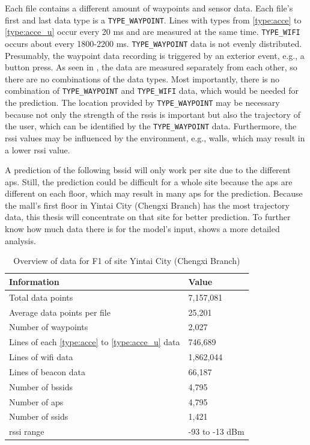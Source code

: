 Each file contains a different amount of waypoints and sensor data.
Each file's first and last data type is a \texttt{TYPE\_WAYPOINT}.
Lines with types from \ref{type:acce} to \ref{type:acce_u} occur every 20 ms and are measured at the same time.
\texttt{TYPE\_WIFI} occurs about every 1800-2200 ms.
\texttt{TYPE\_WAYPOINT} data is not evenly distributed.
Presumably, the waypoint data recording is triggered by an exterior event, e.g., a button press. 
As seen in , the data are measured separately from each other, so there are no combinations of the data types.
Most importantly, there is no combination of \texttt{TYPE\_WAYPOINT} and \texttt{TYPE\_WIFI} data, which would be needed for the prediction.
The location provided by \texttt{TYPE\_WAYPOINT} may be necessary because not only the strength of the \acp{rssi} is important but also the trajectory of the user, which can be identified by the \texttt{TYPE\_WAYPOINT} data.
Furthermore, the \ac{rssi} values may be influenced by the environment, e.g., walls, which may result in a lower \ac{rssi} value.

A prediction of the following \ac{bssid} will only work per site due to the different \acp{ap}.
Still, the prediction could be difficult for a whole site because the \acp{ap} are different on each floor, which may result in many \acp{ap} for the prediction.
Because the mall's first floor in Yintai City (Chengxi Branch) has the most trajectory data, this thesis will concentrate on that site for better prediction.
To further know how much data there is for the model's input,  shows a more detailed analysis.

\begin{table}[h]
    \centering
    \caption{Overview of data for F1 of site Yintai City (Chengxi Branch)}
    \begin{tabular}{|l|l|}
    \hline
    \textbf{Information} & \textbf{Value} \\ \hline
    Total data points & 7,157,081 \\ \hline
    Average data points per file & 25,201 \\ \hline
    Number of waypoints & 2,027 \\ \hline
    Lines of each \ref{type:acce} to \ref{type:acce_u} data & 746,689 \\ \hline
    Lines of \ac{wifi} data & 1,862,044 \\ \hline
    Lines of beacon data & 66,187 \\ \hline
    Number of \acp{bssid} & 4,795 \\ \hline
    Number of \acp{ap} & 4,795 \\ \hline
    Number of \acp{ssid} & 1,421 \\ \hline
    \ac{rssi} range & -93 to -13 dBm \\ \hline
    \end{tabular}
\label{tab:data_summary}
\end{table}


